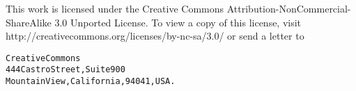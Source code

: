 This work is licensed under the Creative Commons 
Attribution-NonCommercial-ShareAlike 3.0 Unported License.
To view a copy of this license, visit \\
http://creativecommons.org/licenses/by-nc-sa/3.0/
or send a letter to

\begin{alltt}
Creative Commons\\
444 Castro Street, Suite 900\\
Mountain View, California, 94041, USA.
\end{alltt}
